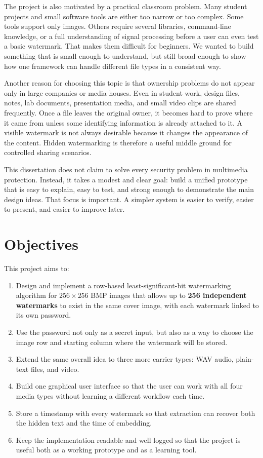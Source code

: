 The project is also motivated by a practical classroom problem. Many student projects and small software tools are either too narrow or too complex. Some tools support only images. Others require several libraries, command-line knowledge, or a full understanding of signal processing before a user can even test a basic watermark. That makes them difficult for beginners. We wanted to build something that is small enough to understand, but still broad enough to show how one framework can handle different file types in a consistent way.

Another reason for choosing this topic is that ownership problems do not appear only in large companies or media houses. Even in student work, design files, notes, lab documents, presentation media, and small video clips are shared frequently. Once a file leaves the original owner, it becomes hard to prove where it came from unless some identifying information is already attached to it. A visible watermark is not always desirable because it changes the appearance of the content. Hidden watermarking is therefore a useful middle ground for controlled sharing scenarios.

This dissertation does not claim to solve every security problem in multimedia protection. Instead, it takes a modest and clear goal: build a unified prototype that is easy to explain, easy to test, and strong enough to demonstrate the main design ideas. That focus is important. A simpler system is easier to verify, easier to present, and easier to improve later.

\section{Objectives}

This project aims to:

\begin{enumerate}[label=\textbf{O\arabic*.}]
    \item Design and implement a row-based least-significant-bit watermarking algorithm for $256 \times 256$ BMP images that allows up to \textbf{256 independent watermarks} to exist in the same cover image, with each watermark linked to its own password.
    \item Use the password not only as a secret input, but also as a way to choose the image row and starting column where the watermark will be stored.
    \item Extend the same overall idea to three more carrier types: WAV audio, plain-text files, and video.
    \item Build one graphical user interface so that the user can work with all four media types without learning a different workflow each time.
    \item Store a timestamp with every watermark so that extraction can recover both the hidden text and the time of embedding.
    \item Keep the implementation readable and well logged so that the project is useful both as a working prototype and as a learning tool.
\end{enumerate}

